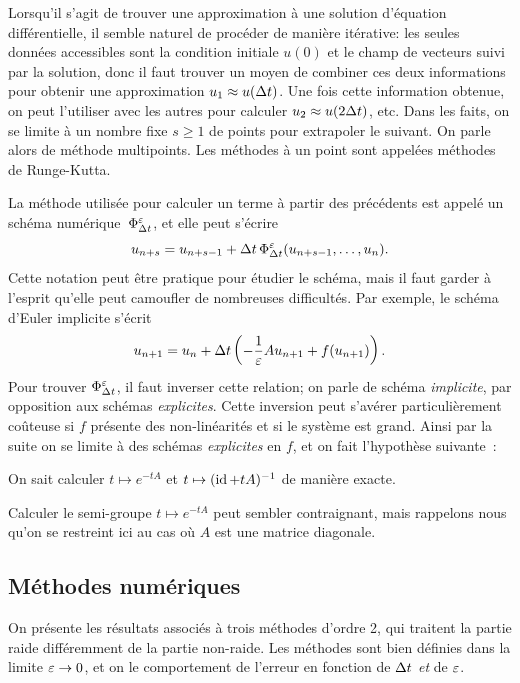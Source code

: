 Lorsqu'il s'agit de trouver une approximation à une solution d'équation différentielle, il semble naturel de procéder de manière itérative: les seules données accessibles sont la condition initiale $u(0)$ et le champ de vecteurs suivi par la solution, donc il faut trouver un moyen de combiner ces deux informations pour obtenir une approximation $u_1 \approx u(\Delta t)$. Une fois cette information obtenue, on peut l'utiliser avec les autres pour calculer $u_2 \approx u(2\Delta t)$, etc. Dans les faits, on se limite à un nombre fixe $s \geq 1$ de points pour extrapoler le suivant. On parle alors de méthode multipoints. Les méthodes à un point sont appelées méthodes de Runge-Kutta.

La méthode utilisée pour calculer un terme à partir des précédents est appelé un schéma numérique~$\Phi^{\varepsilon}_{\Delta t}$, et elle peut s'écrire 
\begin{equation*}
    u_{n+s} = u_{n+s-1} + \Delta t\, \Phi^{\varepsilon}_{\Delta t} (u_{n+s-1}, \ldots, u_n) .
\end{equation*}
Cette notation peut être pratique pour étudier le schéma, mais il faut garder à l'esprit qu'elle peut camoufler de nombreuses difficultés. Par exemple, le schéma d'Euler implicite s'écrit 
\begin{equation*}
    u_{n+1} = u_n + \Delta t \left( 
        - \frac{1}{\varepsilon}A u_{n+1} + f(u_{n+1}) 
    \right) .
\end{equation*}
Pour trouver $\Phi^{\varepsilon}_{\Delta t}$, il faut inverser cette relation; on parle de schéma \textit{implicite}, par opposition aux schémas \textit{explicites}. Cette inversion peut s'avérer particulièrement coûteuse si $f$ présente des non-linéarités et si le système est grand. Ainsi par la suite on se limite à des schémas \textit{explicites} en $f$, et on fait l'hypothèse suivante~:
\begin{FRassumption*}
    On sait calculer $t \mapsto e^{-tA}$ et $t \mapsto (\operatorname{id} + t A)^{-1}$ de manière exacte. 
\end{FRassumption*}
\noindent%
Calculer le semi-groupe $t \mapsto e^{-tA}$ peut sembler contraignant, mais rappelons nous qu'on se restreint ici au cas où $A$ est une matrice diagonale. 



\subsection*{Méthodes numériques}

On présente les résultats associés à trois méthodes d'ordre 2, qui traitent la partie raide différemment de la partie non-raide. Les méthodes sont bien définies  dans la limite $\varepsilon \rightarrow 0$, et on le comportement de l’erreur en fonction de $\Delta t$ \textit{et} de $\varepsilon$.

